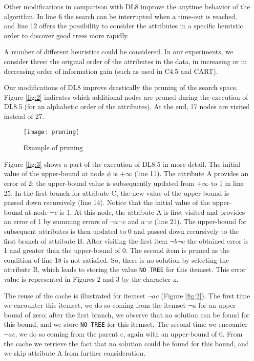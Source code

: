 Other modifications in comparison with DL8 improve the anytime behavior of the algorithm. In line 6 the search can be interrupted when a time-out is reached, and line 12 offers the possibility to consider the attributes in a specific heuristic order to discover good trees more rapidly.

A number of different heuristics could be considered. In our experiments, we consider three: the original order of the attributes in the data, in increasing or in decreasing order of information gain (such as used in C4.5 and CART).

Our modifications of DL8 improve drastically the pruning of the search space. Figure \ref{fig:2} indicates which additional nodes are pruned during the execution of DL8.5 (for an alphabetic order of the attributes). At the end, 17 nodes are visited instead of 27.

\begin{figure}
	\texttt{[image: pruning]}
	\caption{ Example of pruning}
\end{figure}

Figure \ref{fig:3} shows a part of the execution of DL8.5 in more detail. The initial value of the upper-bound at node $\phi$ is $+\infty$ (line 11). The attribute A provides an error of 2; the upper-bound value is subsequently updated from $+\infty$ to 1 in line 25. In the first branch for attribute C, the new value of the upper-bound is passed down recursively (line 14). Notice that the initial value of the upper-bound at node $\neg c$ is 1. At this node, the attribute A is first visited and provides an error of 1 by summing errors of $\neg a\neg c$ and $a\neg c$ (line 21). The upper-bound for subsequent attributes is then updated to 0 and passed down recursively to the first branch of attribute B. After visiting the first item $\neg b\neg c$ the obtained error is 1 and greater than the upper-bound of 0. The second item is pruned as the condition of line 18 is not satisfied. So, there is no solution by selecting the attribute B, which leads to storing the value \verb|NO TREE| for this itemset. This error value is represented in Figures 2 and 3 by the character x.

The reuse of the cache is illustrated for itemset $\neg ac$ (Figure \ref{fig:2}). The first time we encounter this itemset, we do so coming from the itemset $\neg a$ for an upper-bound of zero; after the first branch, we observe that no solution can be found for this bound, and we store \verb|NO TREE| for this itemset. The second time we encounter $\neg ac$, we do so coming from the parent c, again with an upper-bound of 0. From the cache we retrieve the fact that no solution could be found for this bound, and we skip attribute A from further consideration.